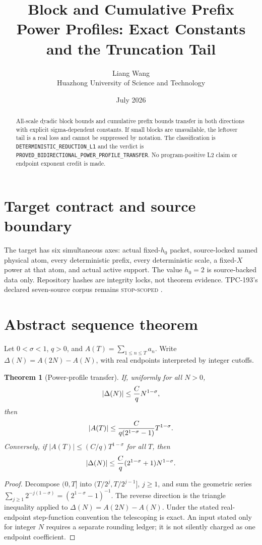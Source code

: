 \documentclass[11pt]{article}
\title{\textbf{Block and Cumulative Prefix Power Profiles: Exact Constants and the Truncation Tail}}
\author{Liang Wang\\Huazhong University of Science and Technology}
\date{July 2026}
\newtheorem{theorem}{Theorem}
\begin{document}
\maketitle
\begin{abstract}
All-scale dyadic block bounds and cumulative prefix bounds transfer in both directions with explicit sigma-dependent constants.  If small blocks are unavailable, the leftover tail is a real loss and cannot be suppressed by notation.
The classification is \texttt{DETERMINISTIC\_\allowbreak{}REDUCTION\_\allowbreak{}L1} and the
verdict is \texttt{PROVED\_\allowbreak{}BIDIRECTIONAL\_\allowbreak{}POWER\_\allowbreak{}PROFILE\_\allowbreak{}TRANSFER}.  No program-positive L2
claim or endpoint exponent credit is made.
\end{abstract}

\section{Target contract and source boundary}
The target has six simultaneous axes: actual fixed-\(h_0\) packet,
source-locked named physical atom, every deterministic prefix, every
deterministic scale, a fixed-\(X\) power at that atom, and actual active
support.  The value \(h_0=2\) is source-backed data only.  Repository hashes
are integrity locks, not theorem evidence.  TPC-193's declared seven-source
corpus remains \textsc{stop-scoped} \citep{WangTPC193}.


\section{Abstract sequence theorem}
Let \(0<\sigma<1\), \(q>0\), and
\(A(T)=\sum_{1\le n\le T}a_n\).  Write
\(\Delta(N)=A(2N)-A(N)\), with real endpoints interpreted by integer
cutoffs.

\begin{theorem}[Power-profile transfer]\label{thm:transfer}
If, uniformly for all \(N>0\),
\[
 |\Delta(N)|\le {C\over q}N^{1-\sigma},
\]
then
\[
 |A(T)|\le {C\over q(2^{1-\sigma}-1)}T^{1-\sigma}.
\]
Conversely, if \(|A(T)|\le (C/q)T^{1-\sigma}\) for all \(T\), then
\[
 |\Delta(N)|\le {C\over q}(2^{1-\sigma}+1)N^{1-\sigma}.
\]
\end{theorem}
\begin{proof}
Decompose \((0,T]\) into
\((T/2^j,T/2^{j-1}]\), \(j\ge1\), and sum the geometric series
\(\sum_{j\ge1}2^{-j(1-\sigma)}
=(2^{1-\sigma}-1)^{-1}\).
The reverse direction is the triangle inequality applied to
\(\Delta(N)=A(2N)-A(N)\).  Under the stated real-endpoint step-function
convention the telescoping is exact.  An input stated only for integer
\(N\) requires a separate rounding ledger; it is not silently charged as
one endpoint coefficient.
\end{proof}
\end{document}

